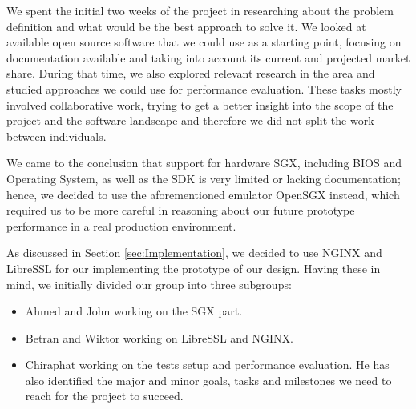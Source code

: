 \documentclass[../main.tex]{subfiles}
\begin{document}

We spent the initial two weeks of the project in researching about the problem
definition and what would be the best approach to solve it. We looked at
available open source software that we could use as a starting point, focusing
on documentation available and taking into account its current and projected
market share. During that time, we also explored relevant research in the area
and studied approaches we could use for performance evaluation. These tasks
mostly involved collaborative work, trying to get a better insight into the
scope of the project and the software landscape and therefore we did not split
the work between individuals.

We came to the conclusion that support for hardware SGX, including BIOS and
Operating System, as well as the \intel SDK is very limited or lacking
documentation; hence, we decided to use the aforementioned emulator OpenSGX
instead, which required us to be more careful in reasoning about our future
prototype performance in a real production environment.

As discussed in Section \ref{sec:Implementation}, we decided to use NGINX and
LibreSSL for our implementing the prototype of our design. Having these in
mind, we initially divided our group into three subgroups:

\begin{itemize}
	\item Ahmed and John working on the SGX part.
	\item Betran and Wiktor working on LibreSSL and NGINX.
	\item Chiraphat working on the tests setup and performance evaluation.
          He has also identified the major and minor goals, tasks and
          milestones we need to reach for the project to succeed. %
\end{itemize}


\end{document}
